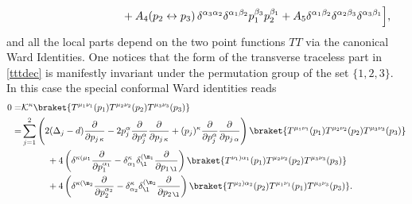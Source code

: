 \documentclass[a4paper,11pt,openright,twoside]{book}
\let\a=\alpha   \let\b=\beta   \let\g=\gamma   \let\d=\delta
\numberwithin{equation}{section}
\begin{document}
{{{\begin{align}
	&\hspace{3.5cm}+ A_4(p_2\leftrightarrow p_3)\, \d^{\a_3\a_2} \d^{\a_1\b_2}  p_1^{\b_3} p_2^{\b_1} + A_5  \d^{\a_1\b_2}  \d^{\a_2\b_3}  \d^{\a_3\b_1}\Big],\label{tttdec}
\end{align}
and all the local parts depend on the two point functions $TT$ via the canonical Ward Identities. One notices that the form of the transverse traceless part in \eqref{tttdec} is manifestly invariant under the permutation group of the set $\{1,2,3\}$. 
In this case the special conformal Ward identities reads
\begin{align}
	0=&\mathcal{K}^\kappa\braket{T^{\mu_1\nu_1}(p_1)T^{\mu_2\nu_2}(p_2)T^{\mu_3\nu_3}(p_3)}\notag\\
	=&\sum_{j=1}^{2}\left(2(\Delta_j-d)\frac{\partial}{\partial p_{j\,\kappa}}-2p_j^\alpha\frac{\partial}{\partial p_j^\alpha}\frac{\partial}{\partial p_{j\,\kappa}}+(p_j)^\kappa\frac{\partial}{\partial p_j^\alpha}\frac{\partial}{\partial p_{j\,\alpha}}\right)\braket{T^{\mu_1\nu_1}(p_1)T^{\mu_2\nu_2}(p_2)T^{\mu_3\nu_3}(p_3)}\notag\\
	&\hspace{1cm}+4\left(\delta^{\kappa(\mu_1}\frac{\partial}{\partial p_1^{\alpha_1}}-\delta^\kappa_{\alpha_1}\d_\l^{(\m_1}\frac{\partial}{\partial p_{1\,\l}}\right)\braket{ T^{\nu_1)\alpha_1}(p_1)T^{\mu_2\nu_2}(p_2)T^{\mu_3\nu_3}(p_3)}\notag\\
	&\hspace{1cm}+4\left(\delta^{\kappa(\m_2}\frac{\partial}{\partial p_2^{\a_2}}-\delta^\kappa_{\a_2}\d^{(\m_2}_\l\frac{\partial}{\partial p_{2\,\l}}\right)\braket{ T^{\mu_2)\a_2}(p_2)T^{\mu_1\nu_1}(p_1)T^{\mu_3\nu_3}(p_3)}.
\end{align}

}}}
\end{document}
